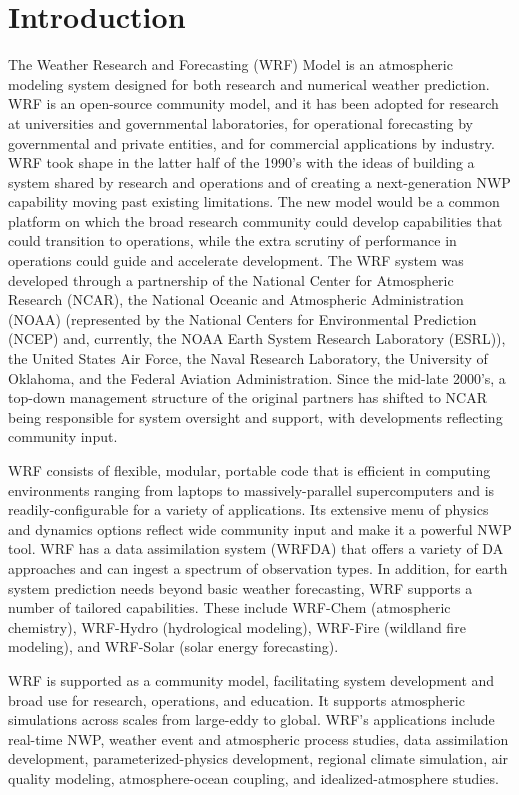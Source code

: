 \chapter{Introduction}
\label{introduction_chap}
The Weather Research and Forecasting (WRF) Model is
an atmospheric modeling system designed for both research and numerical 
weather prediction.  WRF is an open-source community model, and it has been 
adopted for research at universities and governmental laboratories, 
for operational forecasting by governmental and private entities,
and for commercial applications by industry.  WRF took shape in the latter 
half of the 1990's with the ideas of building a system shared by research 
and operations and of creating a next-generation NWP capability moving 
past existing limitations.  The new model would be a 
common platform on which the broad research community 
could develop capabilities that could transition to operations, 
while the extra scrutiny of performance in operations
could guide and accelerate development.  The WRF system was developed
through a partnership of the National 
Center for Atmospheric Research (NCAR), the National Oceanic and Atmospheric 
Administration (NOAA) (represented by the National Centers for Environmental 
Prediction (NCEP) and, currently, the NOAA Earth System Research Laboratory (ESRL)), 
the United States Air Force, the Naval Research Laboratory, the 
University of Oklahoma, and the Federal Aviation Administration.  
Since the mid-late 2000's, a top-down management structure 
of the original partners has shifted to NCAR being responsible for system 
oversight and support, with developments reflecting community input. 

WRF consists of flexible, modular, portable code that is 
efficient in computing environments ranging from laptops to 
massively-parallel supercomputers and is readily-configurable for 
a variety of applications.  Its extensive menu of physics
and dynamics options reflect wide community input
and make it a powerful NWP tool.  WRF has a data assimilation system (WRFDA)
that offers a variety of DA approaches and can ingest a spectrum of 
observation types.  In addition, for earth system prediction needs 
beyond basic weather forecasting, WRF supports a number of tailored capabilities.  
These include WRF-Chem (atmospheric chemistry), 
WRF-Hydro (hydrological modeling), WRF-Fire (wildland fire modeling), 
and WRF-Solar (solar energy forecasting).

WRF is supported as a community model, facilitating system development
and broad use for research, operations, and education.  It supports  
atmospheric simulations across scales from large-eddy to global.  
WRF's applications include real-time NWP, weather event and 
atmospheric process studies, data assimilation development, 
parameterized-physics development, regional climate simulation, air 
quality modeling, atmosphere-ocean coupling, and idealized-atmosphere studies.  

